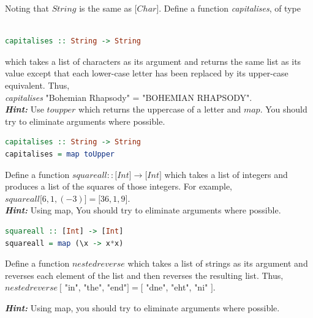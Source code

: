 \documentclass{article}
\begin{document}
\begin{exercise}
Noting that $String$ is the same as $\lbrack Char \rbrack$. Define a function \textit{capitalises}, of type
\begin{lstlisting}[language=Haskell]

capitalises :: String -> String
\end{lstlisting}
which takes a list of characters as its argument and returns the
same list as its value except that each lower-case letter has been replaced by its
upper-case equivalent. Thus, \\ \textit{capitalises} "Bohemian Rhapsody" = "BOHEMIAN RHAPSODY". \\
\textbf{\textit{Hint:}} Use $toupper$ which returns the uppercase of a letter and  $map$. You should try to eliminate arguments where possible. 
\end{exercise} 

\begin{solution}
\begin{lstlisting}[language=Haskell]
capitalises :: String -> String
capitalises = map toUpper
\end{lstlisting} 
\end{solution}
\pagebreak
\begin{exercise} 
Define a function $squareall :: \lbrack Int \rbrack  \rightarrow  \lbrack Int \rbrack $ which takes a list of integers and
produces a list of the squares of those integers. For example, \\
$squareall \lbrack 6, 1, (-3) \rbrack = \lbrack 36, 1, 9 \rbrack $. \\
\textbf{\textit{Hint:}} Using map, You should try to eliminate arguments where possible. 

\end{exercise} 

\begin{solution}
\begin{lstlisting}[language=Haskell]
squareall :: [Int] -> [Int]
squareall = map (\x -> x*x)
\end{lstlisting}
\end{solution}


\begin{exercise} 
Define a function $nestedreverse$ which takes a list of strings as its argument
and reverses each element of the list and then reverses the resulting list. Thus, \\
$nestedreverse \ \lbrack$ "in", "the", "end"$ \rbrack = \lbrack$ "dne", "eht", "ni" $\rbrack$.

\textbf{\textit{Hint:}} Using map, you should try to eliminate arguments where possible. 

\end{exercise} 
\end{document}
